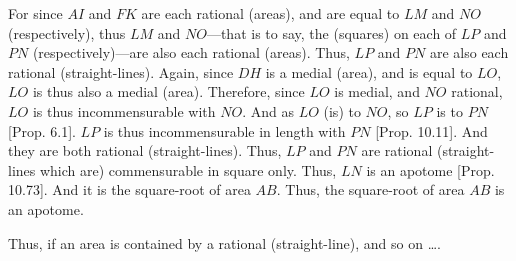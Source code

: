\begin{Parallel}{}{}
{For since $AI$ and $FK$ are each rational (areas), and are equal to
$LM$ and $NO$ (respectively), thus  $LM$ and $NO$---that is to say, the
(squares) on each of $LP$ and $PN$ (respectively)---are  also
each rational (areas). Thus, $LP$ and $PN$ are also each rational (straight-lines). 
Again, since $DH$ is a medial (area), and is equal to $LO$, $LO$ is thus
also a medial (area). Therefore, since $LO$ is medial, and $NO$ rational, 
$LO$ is thus incommensurable with $NO$. And as $LO$ (is) to $NO$,
so $LP$ is to $PN$ [Prop. 6.1]. $LP$ is
thus incommensurable in length with $PN$ [Prop. 10.11]. And they are both rational
(straight-lines). Thus, $LP$ and $PN$ are rational (straight-lines which are)
commensurable in square only. Thus, $LN$ is an apotome [Prop. 10.73]. And it is the square-root of area $AB$. Thus, the square-root of area $AB$ is an apotome.

Thus, if an area is contained by a rational (straight-line), and
so on \ldots.}
\end{Parallel}


